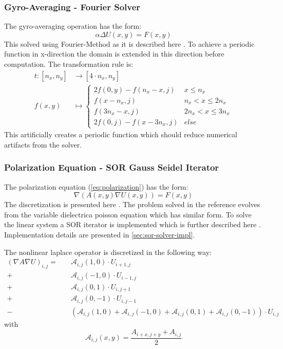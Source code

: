 \subsubsection{Gyro-Averaging - Fourier Solver}
The gyro-averaging operation has the form:
\begin{equation}
    \alpha \Delta U(x, y) = F(x, y)
\end{equation}
This solved using Fourier-Method as it is described here \cite{fft-poisson}. To achieve a periodic function in x-direction the domain is extended in this direction before computation. The transformation rule is:
\begin{equation}
\begin{split}
    t\colon [n_x, n_y] & \to [4 \cdot n_x, n_y]\\
    f(x, y) &\mapsto \begin{cases}
    2 f(0, y) - f(n_x - x, j) & x \leq n_x\\
    f(x - n_x, j) & n_x < x \leq 2n_x\\
    f(3n_x-x,j) & 2n_x < x \leq 3n_x \\
    2 f(0, j) - f(x - 3n_x, j) & else
    \end{cases}
\end{split}
\end{equation}
This artificially creates a periodic function which should reduce numerical artifacts from the solver.

\subsubsection{Polarization Equation - \ac{SOR} Gauss Seidel Iterator}
The polarization equation (\autoref{eq:polarization}) has the form:
\begin{equation}
    \nabla\left( A(x, y) \nabla U(x, y)\right) = F(x, y)
\end{equation}
The discretization is presented here \cite{DielectricPoisson}. The problem solved in the reference evolves from the variable dielectrica poisson equation which has similar form. To solve the linear system a \ac{SOR} iterator is implemented which is further described here \cite{SORPaper}. Implementation details are presented in \autoref{sec:sor-solver-impl}.

The nonlinear laplace operator is discretized in the following way:
\begin{equation}
\begin{split}
    (\nabla A \nabla U)_{i,j} = \quad &
    \mathcal{A}_{i, j}(1, 0) \cdot U_{i + 1, j} \\
    + &\mathcal{A}_{i, j}(-1, 0) \cdot U_{i - 1, j}\\
    + &\mathcal{A}_{i, j}(0, 1) \cdot U_{i, j + 1} \\
    + &\mathcal{A}_{i, j}(0, -1) \cdot U_{i, j - 1} \\
    - &\left(\mathcal{A}_{i, j}(1, 0) + \mathcal{A}_{i, j}(-1, 0) + \mathcal{A}_{i, j}(0, 1) + \mathcal{A}_{i, j}(0, -1)\right) \cdot U_{i, j}
\end{split}
\end{equation}
with
\begin{equation}
    \mathcal{A}_{i,j}(x, y) = \frac{A_{i + x, j + y} + A_{i, j}}{2}
\end{equation}